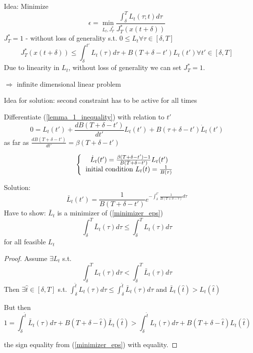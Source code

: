 Idea: Minimize 
\begin{equation}\label{minimizer_eps}
\epsilon = \min_{L_t,J^*_T}\frac{\int_{\delta}^{T}L_t(\tau;t)d\tau}{J_T^*(x(t+\delta))}
\end{equation}
$J^*_T = 1$ - without loss of generality
s.t. $0 \leq L_t \forall \tau \in [\delta,T]$
\begin{equation*}
J^*_T(x(t+\delta)) \leq \int_{\delta}^{t'}L_t(\tau)d\tau + B(T+\delta-t')L_t(t') \forall t' \in [\delta, T]
\end{equation*}
Due to linearity in $L_t$, without loss of generality we can set $J_T^* = 1$.

$\Rightarrow$ infinite dimensional linear problem

Idea for solution:
second constraint has to be active for all times 

Differentiate (\ref{lemma_1_inequality}) with relation to $t'$ 
\begin{equation*}
0 = L_t(t') + \frac{dB(T+\delta-t')}{dt'}L_t(t') + B(\tau + \delta - t') \dot L_t(t')
\end{equation*} 
as far as $\frac{dB(T+\delta-t')}{dt'} = \beta(T+\delta - t')$

\begin{equation*}
\left \{
  \begin{tabular}{c}
  $\dot L_t(t') = \frac{\beta(T+\delta - t') -1}{B(T+\delta - t')}L_t(t')$ \\
 initial condition $L_t(t)=\frac{1}{B(\tau)}$
  \end{tabular}
\right .
\end{equation*}

Solution:
\begin{equation*}
\bar L_t(t') = \frac{1}{B(T+\delta-t')}e^{-\int_{\delta}^{t'}\frac{1}{B(T+\delta-\tau)}d\tau}
\end{equation*}
Have to show: $\bar L_t$ is a minimizer of (\ref{minimizer_eps})
\begin{equation*}
\int_{\delta}^{T} \bar L_t(\tau)d\tau \leq \int_{\delta}^{T} L_t(\tau)d\tau 
\end{equation*}
for all feasible $L_t$

\begin{proof}

Assume $\exists L_t$ s.t. 
\begin{equation*}
\int_{\delta}^{T}L_t(\tau)d\tau < \int_{\delta}^{T}\bar L_t(\tau)d\tau
\end{equation*}
Then $\exists \hat t \in [\delta, T]$ s.t. $\int_{\delta}^{\hat t}L_t(\tau)d\tau \leq \int_{\delta}^{\hat t}\bar L_t(\tau)d\tau$ and $\bar L_t(\hat t) > L_t(\hat t)$

But then 
\begin{equation}
1 = \int_{\delta}^{\hat t} \bar L_t(\tau)d\tau + B(T+\delta-\hat t)\bar L_t(\hat t) > \int_{\delta}^{\hat t}L_t(\tau)d\tau + B(T+\delta-\hat t) L_t(\hat t)
\end{equation}

the sign equality from (\ref{minimizer_eps}) with equality.
\end{proof}

